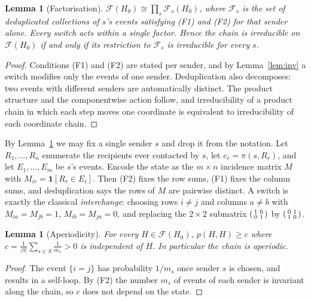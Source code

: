 \documentclass[11pt]{article}
\newtheorem{lemma}[theorem]{Lemma}
\theoremstyle{definition}
\newcommand{\Fcal}{\mathcal{F}}
\begin{document}
\begin{lemma}[Factorisation]\label{lem:fact}
$\Fcal(H_0)\cong\prod_{s}\Fcal_s(H_0)$, where $\Fcal_s$ is the set of
deduplicated collections of $s$'s events satisfying (F1) and (F2) for that
sender alone. Every switch acts within a single factor. Hence the chain is
irreducible on $\Fcal(H_0)$ if and only if its restriction to $\Fcal_s$ is
irreducible for every $s$.
\end{lemma}

\begin{proof}
Conditions (F1) and (F2) are stated per sender, and by Lemma~\ref{lem:inv} a
switch modifies only the events of one sender. Deduplication also decomposes:
two events with different senders are automatically distinct. The product
structure and the componentwise action follow, and irreducibility of a product
chain in which each step moves one coordinate is equivalent to irreducibility of
each coordinate chain.
\end{proof}

\medskip
By Lemma~\ref{lem:fact} we may fix a single sender $s$ and drop it from the
notation. Let $R_1,\dots,R_n$ enumerate the recipients ever contacted by $s$,
let $c_r=\pi(s,R_r)$, and let $E_1,\dots,E_m$ be $s$'s events. Encode the state
as the $m\times n$ incidence matrix $M$ with $M_{ir}=\mathbf{1}[R_r\in E_i]$.
Then (F2) fixes the row sums, (F1) fixes the column sums, and deduplication
says the rows of $M$ are pairwise distinct. A switch is exactly the classical
\emph{interchange}: choosing rows $i\neq j$ and columns $a\neq b$ with
$M_{ia}=M_{jb}=1$, $M_{ib}=M_{ja}=0$, and replacing the $2\times2$ submatrix
$\begin{psmallmatrix}1&0\\0&1\end{psmallmatrix}$ by
$\begin{psmallmatrix}0&1\\1&0\end{psmallmatrix}$.

\begin{lemma}[Aperiodicity]\label{lem:aper}
For every $H\in\Fcal(H_0)$, $p(H,H)\ge c$ where
$c=\frac{1}{|S|}\sum_{s\in S}\frac{1}{m_s}>0$ is independent of $H$. In
particular the chain is aperiodic.
\end{lemma}

\begin{proof}
The event $\{i=j\}$ has probability $1/m_s$ once sender $s$ is chosen, and
results in a self-loop. By (F2) the number $m_s$ of events of each sender is
invariant along the chain, so $c$ does not depend on the state.
\end{proof}
\end{document}
